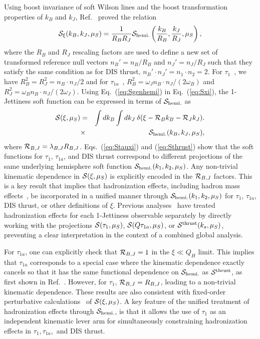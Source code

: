 \documentclass[prd,aps,nofootinbib,twocolumn,showpacs,amsmath,superscriptaddress]{revtex4-2}
\newcommand{\nn}{\nonumber}
\newcommand{\bea}{\begin{eqnarray}}
\newcommand{\eea}{\end{eqnarray}}
\begin{document}
 Using boost invariance of soft Wilson lines  and the boost transformation properties of  $k_B$ and $k_J$,  Ref.~\cite{Kang:2013nha} proved the relation 
 \bea
\label{eq:Sgenhemi}
{\cal S}_{\xi}(k_B,k_J,\mu_S) =\frac{1}{R_BR_J} {\cal S}_{\rm hemi.}\left(\frac{k_B}{R_B},\frac{k_J}{R_J},\mu_S\right),
\eea
where the $R_B$ and $R_J$ rescaling factors are used to define a new set of transformed reference null vectors $n_B'= n_B/R_B$ and  $n_J'= n_J/R_J$
such that they satisfy the same condition as for  DIS thrust, $n_B'\cdot n_J'=n_1\cdot n_2=2$. For $\tau_1$~\cite{Cao:2024ota}, we have $R_B^2 = R_J^2 = n_B\cdot n_J/2$ and for  $\tau_{1a}$~\cite{Kang:2013nha},  $R_{B}^2 = \omega_{J}n_{B}\cdot n_{J}/(2\omega_{B})$ and $R_{J}^2 = \omega_{B}n_{B}\cdot n_{J}/(2\omega_{J})$. Using Eq.~(\ref{eq:Sgenhemi}) in Eq.~(\ref{eq:Sxi}), the 1-Jettiness soft function  can be expressed in terms of ${\cal S}_{\rm hemi.}$   as
\bea
\label{eq:Stauxi}
{\cal S}(\xi,\mu_S) &=& \int dk_B \int dk_J \>\delta(\xi - {\cal R}_B k_B -{\cal R}_J k_J). \nn \\
&\times&{\cal S}_{\rm hemi.}(k_B,k_J,\mu_S) ,
\eea
where ${\cal R}_{B,J}=\lambda_{B,J} R_{B,J}$.
Eqs.~(\ref{eq:Stauxi}) and (\ref{eq:Sthrust}) show that the soft functions for $\tau_1$, $\tau_{1a}$, and DIS thrust correspond to different projections of the same underlying hemisphere soft function  ${\cal S}_{\rm hemi.}(k_1,k_2,\mu_S)$. Any non-trivial kinematic dependence  in ${\cal S}(\xi,\mu_S)$ is explicitly encoded in the  ${\cal R}_{B,J}$ factors. 
This is a key result that implies that hadronization effects, including hadron mass effects~\cite{Mateu:2012nk}, be incorporated  in a unified manner through ${\cal S}_{\rm hemi.}(k_1,k_2,\mu_S)$ for $\tau_1$, $\tau_{1a}$, DIS thrust, or other definitions of $\xi$. Previous analyses~\cite{Kang:2012zr,Kang:2013wca,Kang:2013nha,Cao:2024ota,Ee:2025scz}  have treated hadronization effects for each 1-Jettiness observable separately by directly working with the projections  ${\cal S}(\tau_1,\mu_S)$, ${\cal S}(Q\tau_{1a},\mu_S)$, or ${\cal S}^{\rm thrust}(k_s,\mu_S)$, preventing a clear interpretation in the context of a combined global analysis.

For $\tau_{1a}$, one can explicitly check that  ${\cal R}_{B,J}=1$ in the $\xi\ll Q_H$ limit. This implies that $\tau_{1a}$ corresponds to a special case where the kinematic dependence exactly  cancels  so that it has the same functional dependence on ${\cal S}_{\rm hemi.}$ as ${\cal S}^{\rm thrust}$, as first shown in Ref.~\cite{Kang:2013nha}. However, for $\tau_1$,  ${\cal R}_{B,J}=R_{B,J}$, leading to a non-trivial kinematic dependence. 
 These results are also consistent with  fixed-order perturbative calculations~\cite{Jouttenus:2011wh,Boughezal:2015eha} of ${\cal S}(\xi,\mu_S)$. A key feature of the unified treatment of hadronization effects through ${\cal S}_{\rm hemi.}$, is that it allows the use of $\tau_1$ as an independent kinematic lever arm for simultaneously constraining hadronization effects in $\tau_1,\tau_{1a},$ and DIS thrust.
\end{document}
